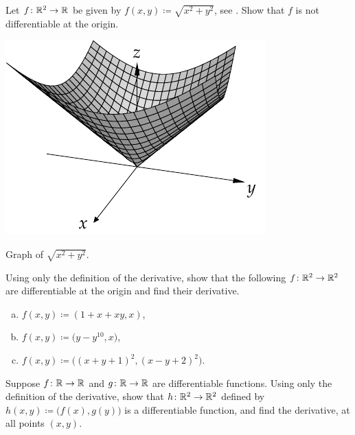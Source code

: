 \begin{exercise}
Let $f \colon {\mathbb{R}}^2 \to {\mathbb{R}}$ be given by
$f(x,y)
\coloneqq
\sqrt{x^2+y^2}$,
see .
Show that $f$ is not differentiable at the origin.
\end{exercise}

\begin{myfigureht}
\includegraphics{figures/distfromorgfunc}
\caption{Graph of $\sqrt{x^2+y^2}$.\label{fig:distfromorgfunc}}
\end{myfigureht}

\begin{samepage}
\begin{exercise}
Using only the definition of the derivative, show that
the following $f \colon {\mathbb{R}}^2 \to {\mathbb{R}}^2$ are differentiable at the origin and
find their derivative.
\begin{enumerate}[a)]
\item
$f(x,y) \coloneqq (1+x+xy,x)$,
\item
$f(x,y) \coloneqq \bigl(y-y^{10},x \bigr)$,
\item
$f(x,y) \coloneqq \bigl( {(x+y+1)}^2 , {(x-y+2)}^2 \bigr)$.
\end{enumerate}
\end{exercise}
\end{samepage}

\begin{exercise}
Suppose $f \colon {\mathbb{R}} \to {\mathbb{R}}$ and $g \colon {\mathbb{R}} \to {\mathbb{R}}$ are differentiable
functions.  Using only the definition of the derivative, show that
$h \colon {\mathbb{R}}^2 \to {\mathbb{R}}^2$ defined by $h(x,y)
\coloneqq \bigl(f(x),g(y)\bigr)$ is a differentiable function, and find the
derivative, at all points $(x,y)$.
\end{exercise}

